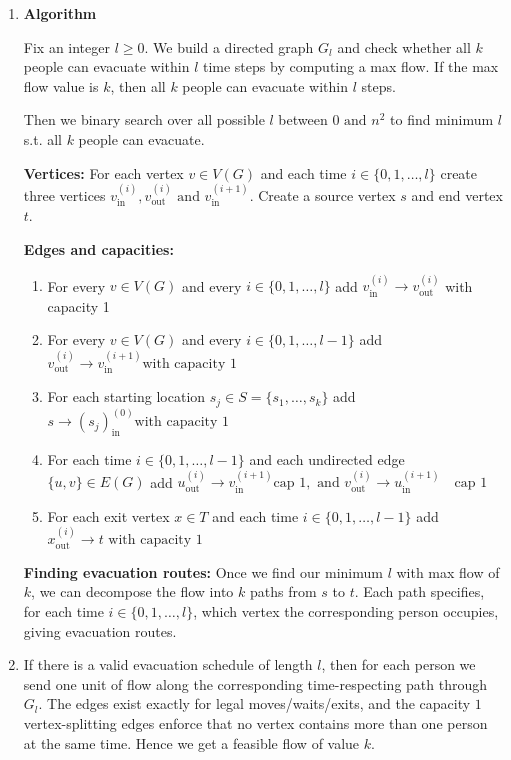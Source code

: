 \documentclass[12pt]{article}
\newcommand{\tand}{\text{ and }}
\begin{document}
\begin{enumerate}
\item[(a)] \textbf{Algorithm}

Fix an integer $l \ge 0$. We build a directed graph $G_l$
and check whether all $k$ people can evacuate within $l$ time steps by computing a max flow. If the max flow value is $k$, then all $k$ people can evacuate within $l$ steps.

Then we binary search over all possible $l$ between $0 \tand n^2$ to find minimum $l$ s.t. all $k$ people can evacuate.

\noindent\textbf{Vertices:}
For each vertex $v\in V(G)$ and each time $i \in\{0,1,\dots, l\}$ create three vertices
$v_{\mathrm{in}}^{(i)}, v_{\mathrm{out}}^{(i)} \tand v_{\mathrm{in}}^{(i+1)}$. Create a source vertex $s$ and end vertex $t$.

\noindent\textbf{Edges and capacities:}
\begin{enumerate}
\item For every $v\in V(G)$ and every $i\in\{0,1,\dots,l\}$ add $v_{\mathrm{in}}^{(i)} \to v_{\mathrm{out}}^{(i)}$ with capacity 1
\item For every $v\in V(G)$ and every $i\in\{0,1,\dots,l-1\}$ add $v_{\mathrm{out}}^{(i)} \to v_{\mathrm{in}}^{(i+1)} \text{with capacity }1$

\item For each starting location $s_j\in S=\{s_1,\dots,s_k\}$ add $s \to (s_j)_{\mathrm{in}}^{(0)} \text{with capacity } 1$

\item For each time $i\in\{0,1,\dots,l-1\}$ and each undirected edge $\{u,v\}\in E(G)$ add $ u_{\mathrm{out}}^{(i)} \to v_{\mathrm{in}}^{(i+1)} \text{cap }1, \tand
v_{\mathrm{out}}^{(i)} \to u_{\mathrm{in}}^{(i+1)} \quad \text{cap }1$

\item For each exit vertex $x\in T$ and each time $i\in\{0,1,\dots,l-1\}$ add $ x_{\mathrm{out}}^{(i)} \to t \text{ with capacity } 1$
\end{enumerate}

\noindent\textbf{Finding evacuation routes:}
Once we find our minimum $l$ with max flow of $k$, we can decompose the flow into $k$ paths from $s$ to $t$. Each path specifies, for each time $i \in \{0, 1, \dots, l\}$, which vertex the corresponding person occupies, giving evacuation routes.

\item[(b)] If there is a valid evacuation schedule of length $l$, then for each person we send
one unit of flow along the corresponding time-respecting path through $G_l$. The edges exist exactly for legal moves/waits/exits, and the capacity $1$ vertex-splitting edges enforce that no vertex contains more than one person at the same time. Hence we get a feasible flow of value $k$.


\end{enumerate}
\end{document}
